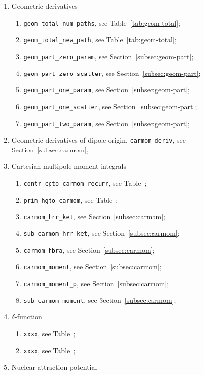 \documentclass[a4paper,11pt,twoside,openright]{book}
\begin{document}
\begin{enumerate}
\begin{enumerate}
  \end{enumerate}
%
  \item Geometric derivatives
  \begin{enumerate}
    \item \verb|geom_total_num_paths|, see Table~\ref{tab:geom-total};
    \item \verb|geom_total_new_path|, see Table~\ref{tab:geom-total};
    \item \verb|geom_part_zero_param|, see Section~\ref{subsec:geom-part};
    \item \verb|geom_part_zero_scatter|, see Section~\ref{subsec:geom-part};
    \item \verb|geom_part_one_param|, see Section~\ref{subsec:geom-part};
    \item \verb|geom_part_one_scatter|, see Section~\ref{subsec:geom-part};
    \item \verb|geom_part_two_param|, see Section~\ref{subsec:geom-part};
  \end{enumerate}
%
  \item Geometric derivatives of dipole origin, \verb|carmom_deriv|, see Section~\ref{subsec:carmom};
%
  \item Cartesian multipole moment integrals
  \begin{enumerate}
    \item \verb|contr_cgto_carmom_recurr|, see Table~;
    \item \verb|prim_hgto_carmom|, see Table~;
    \item \verb|carmom_hrr_ket|, see Section~\ref{subsec:carmom};
    \item \verb|sub_carmom_hrr_ket|, see Section~\ref{subsec:carmom};
    \item \verb|carmom_hbra|, see Section~\ref{subsec:carmom};
    \item \verb|carmom_moment|, see Section~\ref{subsec:carmom};
    \item \verb|carmom_moment_p|, see Section~\ref{subsec:carmom};
    \item \verb|sub_carmom_moment|, see Section~\ref{subsec:carmom};
  \end{enumerate}
%
  \item $\delta$-function
  \begin{enumerate}
    \item \verb|xxxx|, see Table~;
    \item \verb|xxxx|, see Table~;
  \end{enumerate}
%
  \item Nuclear attraction potential

\end{enumerate}
\end{document}
